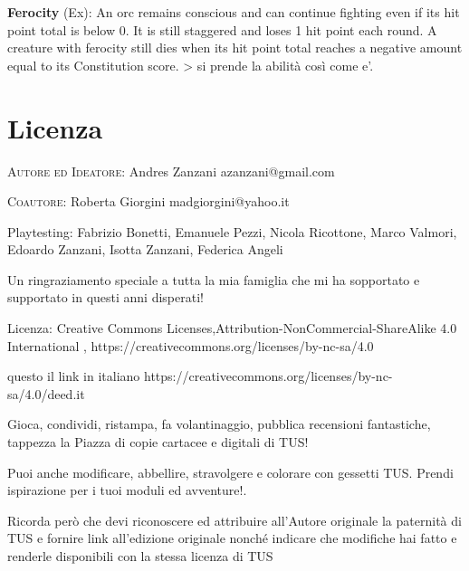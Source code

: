 \documentclass[a4paper,11pt,twoside,openany]{book}
\begin{document}
{\textbf{Ferocity} (Ex): An orc remains conscious and can continue fighting even if its hit point total is below 0. It is still staggered and loses 1 hit point each round. A creature with ferocity still dies when its hit point total reaches a negative amount equal to its Constitution score. \textgreater{} si prende la abilità così come e'.

\pagebreak

\twocolumn

\printindex{}

\pagebreak

\onecolumn


\label{indice-analitico}

\pagebreak

\section{Licenza}

\bigskip

\textsc{Autore ed Ideatore}: Andres Zanzani azanzani@gmail.com

\bigskip
\textsc{Coautore}: Roberta Giorgini madgiorgini@yahoo.it

\bigskip

Playtesting: Fabrizio Bonetti, Emanuele Pezzi, Nicola Ricottone, Marco Valmori, Edoardo Zanzani, Isotta Zanzani, Federica Angeli

\bigskip

Un ringraziamento speciale a tutta la mia famiglia che mi ha sopportato e supportato in questi anni disperati!

\bigskip

Licenza: Creative Commons Licenses,Attribution-NonCommercial-ShareAlike 4.0 International , https://creativecommons.org/licenses/by-nc-sa/4.0

questo il link in italiano https://creativecommons.org/licenses/by-nc-sa/4.0/deed.it

Gioca, condividi, ristampa, fa volantinaggio, pubblica recensioni fantastiche, tappezza la Piazza di copie cartacee e digitali di TUS!

Puoi anche modificare, abbellire, stravolgere e colorare con gessetti TUS. Prendi ispirazione per i tuoi moduli ed avventure!.

Ricorda però che devi riconoscere ed attribuire all'Autore originale la paternità di TUS e fornire link all'edizione originale nonché indicare che modifiche hai fatto e renderle disponibili con la stessa licenza di TUS

}
\end{document}
